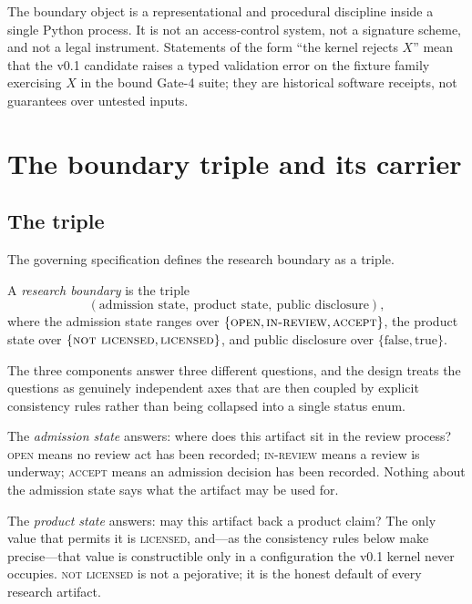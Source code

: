 \begin{boundary}\label{ch04:bd:scope}
The boundary object is a representational and procedural discipline inside a
single Python process. It is not an access-control system, not a signature
scheme, and not a legal instrument. Statements of the form ``the kernel
rejects $X$'' mean that the v0.1 candidate raises a typed validation error on
the fixture family exercising $X$ in the bound Gate-4 suite; they are
historical software receipts, not guarantees over untested inputs.
\end{boundary}

\section{The boundary triple and its carrier}\label{ch04:triple}

\subsection{The triple}

The governing specification defines the research boundary as a triple.

\begin{definition}\label{ch04:def:triple}
A \emph{research boundary} is the triple
\[
(\text{admission state},\ \text{product state},\ \text{public disclosure}),
\]
where the admission state ranges over $\{\textsc{open}, \textsc{in-review},
\textsc{accept}\}$, the product state over $\{\textsc{not licensed},
\textsc{licensed}\}$, and public disclosure over $\{\mathrm{false},
\mathrm{true}\}$.
\end{definition}

The three components answer three different questions, and the design treats
the questions as genuinely independent axes that are then coupled by explicit
consistency rules rather than being collapsed into a single status enum.

The \emph{admission state} answers: where does this artifact sit in the
review process? \textsc{open} means no review act has been recorded;
\textsc{in-review} means a review is underway; \textsc{accept} means an
admission decision has been recorded. Nothing about the admission state says
what the artifact may be used for.

The \emph{product state} answers: may this artifact back a product claim?
The only value that permits it is \textsc{licensed}, and---as the consistency
rules below make precise---that value is constructible only in a configuration
the v0.1 kernel never occupies. \textsc{not licensed} is not a pejorative; it
is the honest default of every research artifact.

